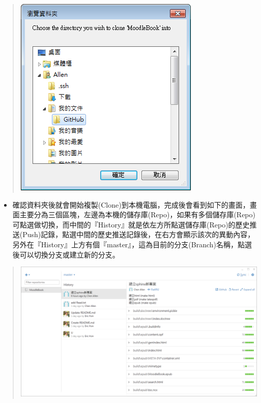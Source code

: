 \documentclass[letterpaper,10pt,english]{sphinxmanual}
\begin{document}
\begin{quote}

\includegraphics{GitHub-Clone-005.png}
\end{quote}
\begin{itemize}
\item {} 
確認資料夾後就會開始複製(Clone)到本機電腦，完成後會看到如下的畫面，畫面主要分為三個區塊，左邊為本機的儲存庫(Repo)，如果有多個儲存庫(Repo)可點選做切換，而中間的『History』就是依左方所點選儲存庫(Repo)的歷史推送(Push)記錄，點選中間的歷史推送記錄後，在右方會顯示該次的異動內容，另外在『History』上方有個『master』，這為目前的分支(Branch)名稱，點選後可以切換分支或建立新的分支。

\end{itemize}
\begin{quote}

\includegraphics{GitHub-Clone-006.png}
\end{quote}
\end{document}
